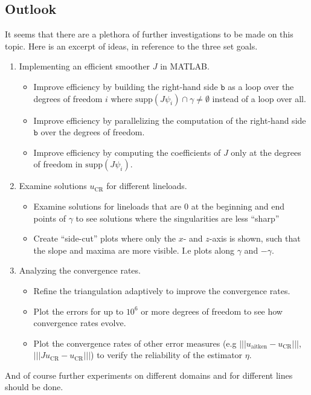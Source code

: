 \documentclass[11pt,a4paper]{article}
\newcommand{\uCR}{u_{\mathrm{CR}}}
\newcommand{\enorm}[1]{\left\lvert\!\left\lvert\!\left\lvert #1 \right\rvert\!\right\rvert\!\right\rvert}
\begin{document}
\subsection{Outlook}
It seems that there are a plethora of further investigations to be made on this topic. Here is an excerpt of ideas, in reference to the three set goals.
\begin{enumerate}
    \item Implementing an efficient smoother \(J\) in MATLAB.
    \begin{itemize}
        \item Improve efficiency by building the right-hand side \(\texttt{b}\) as a loop over the degrees of freedom \(i\) where \(\mathrm{supp}(J\psi_i) \cap \gamma \neq \emptyset\) instead of a loop over all.
        \item Improve efficiency by parallelizing the computation of the right-hand side \(\texttt{b}\) over the degrees of freedom. 
        \item Improve efficiency by computing the coefficients of \(J\) only at the degrees of freedom in \(\mathrm{supp}(J\psi_i)\).
    \end{itemize}
    \item Examine solutions \(\uCR\) for different lineloads.
    \begin{itemize}
        \item Examine solutions for lineloads that are 0 at the beginning and end points of \(\gamma\) to see solutions where the singularities are less ``sharp''
        \item Create ``side-cut'' plots where only the \(x\)- and \(z\)-axis is shown, such that the slope and maxima are more visible. I.e plots along \(\gamma\) and \(-\gamma\).
    \end{itemize}
    \item Analyzing the convergence rates.
    \begin{itemize}
        \item Refine the triangulation adaptively to improve the convergence rates.
        \item Plot the errors for up to \(10^6\) or more degrees of freedom to see how convergence rates evolve.
        \item Plot the convergence rates of other error measures (e.g \(\enorm{u_{\text{aitken}}-\uCR}\), \(\enorm{J\uCR - \uCR}\)) to verify the reliability of the estimator \(\eta\).
    \end{itemize}
\end{enumerate}
And of course further experiments on different domains and for different lines should be done. 
\newpage
\appendix
\end{document}
